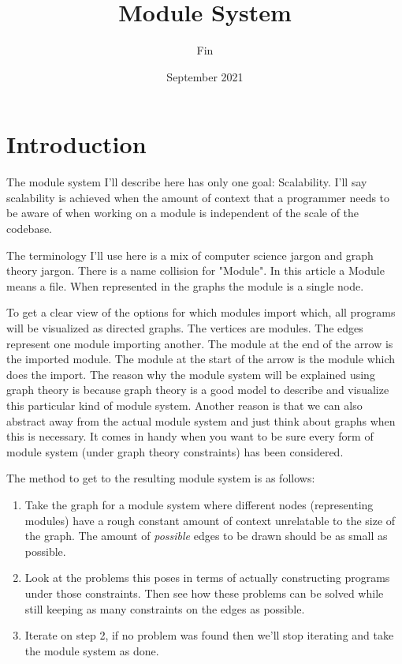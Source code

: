 \documentclass{article}
\title{Module System}
\author{Fin}
\date{September 2021}
\begin{document}
\maketitle

\section{Introduction}
The module system I'll describe here has only one goal: Scalability.
I'll say scalability is achieved when the amount of context that a programmer needs to be aware of when working on a module is independent of the scale of the codebase.

The terminology I'll use here is a mix of computer science jargon and graph theory jargon. There is a name collision for "Module". In this article a Module means a file. When represented in the graphs the module is a single node.

To get a clear view of the options for which modules import which, all programs will be visualized as directed graphs. 
The vertices are modules.
The edges represent one module importing another.
The module at the end of the arrow is the imported module. 
The module at the start of the arrow is the module which does the import. 
The reason why the module system will be explained using graph theory is because graph theory is a good model to describe and visualize this particular kind of module system. Another reason is that we can also abstract away from the actual module system and just think about graphs when this is necessary. It comes in handy when you want to be sure every form of module system (under graph theory constraints) has been considered.


The method to get to the resulting module system is as follows:

\begin{enumerate}
    \item Take the graph for a module system where different nodes
(representing modules) have a rough constant amount of context unrelatable to the size of the graph. The amount of \emph{possible} edges to be drawn should be as small as possible.

    \item Look at the problems this poses in terms of actually constructing programs under those constraints. Then see how these problems can be solved while still keeping as many constraints on the edges as possible.
    
    \item Iterate on step 2, if no problem was found then we’ll stop iterating and take the module system as done.
\end{enumerate}
\end{document}
